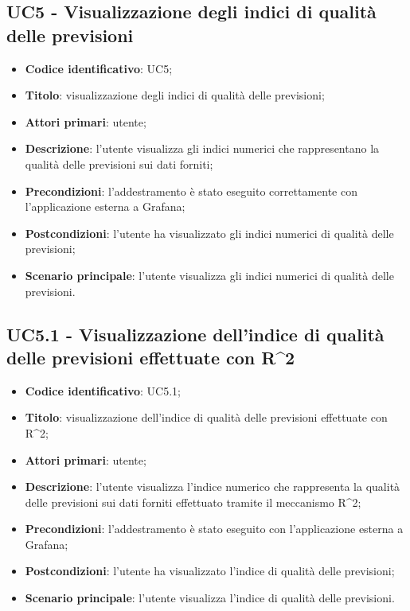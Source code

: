 \subsection{UC5 - Visualizzazione degli indici di qualità delle previsioni}
\begin{itemize}
	\item \textbf{Codice identificativo}: UC5;
	\item \textbf{Titolo}: visualizzazione degli indici di qualità delle previsioni;
	\item \textbf{Attori primari}: utente;
	\item \textbf{Descrizione}: l'utente visualizza gli indici numerici che rappresentano la qualità delle previsioni sui dati forniti;
	\item \textbf{Precondizioni}: l'addestramento è stato eseguito correttamente con l'applicazione esterna a Grafana\glo;
	\item \textbf{Postcondizioni}: l'utente ha visualizzato gli indici numerici di qualità delle previsioni;
	\item \textbf{Scenario principale}: l'utente visualizza gli indici numerici di qualità delle previsioni.
\end{itemize} 
\subsection{UC5.1 - Visualizzazione dell'indice di qualità delle previsioni effettuate con R\^{}2}
\begin{itemize}
	\item \textbf{Codice identificativo}: UC5.1;
	\item \textbf{Titolo}: visualizzazione dell'indice di qualità delle previsioni effettuate con R\^{}2\glo;
	\item \textbf{Attori primari}: utente;
	\item \textbf{Descrizione}: l'utente visualizza l'indice numerico che rappresenta la qualità delle previsioni sui dati forniti effettuato tramite il meccanismo R\^{}2\glo;
	\item \textbf{Precondizioni}: l'addestramento è stato eseguito con l'applicazione esterna a Grafana\glo;
	\item \textbf{Postcondizioni}: l'utente ha visualizzato l'indice di qualità delle previsioni;
	\item \textbf{Scenario principale}: l'utente visualizza l'indice di qualità delle previsioni.
\end{itemize} 
